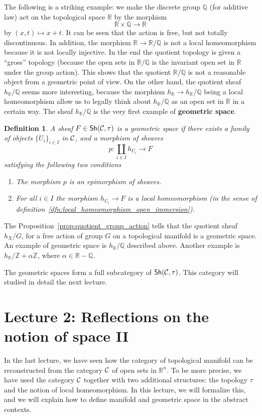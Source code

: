 \documentclass{tufte-book} %
\numberwithin{dummy}{section}
\newtheorem{dfn}[thm]{Definition}
\newcommand{\reals}{\mathbb R}
\newcommand{\intg}{\mathbb Z}
\newcommand{\ratl}{\mathbb Q}
\newcommand{\calc}{{\cal C}}
\newcommand{\lrta}{\longrightarrow}
\begin{document}
The following is a striking example: we make the discrete group $\ratl$ (for additive law) act on the topological space $\reals$ by the morphism
$$
\reals\times \ratl\lrta \reals
$$ 
by $(x,t)\longmapsto x+t$. It can be seen that the action is free, but not totally discontinuous. In addition, the morphism $\reals\lrta \reals/\ratl$ is not a local homeomorphism because it is not locally injective. In the end the quotient topology is given a ``gross'' topology (because the open sets in $\reals/\ratl$ is the invariant open set in $\reals$ under the group action). This shows that the quotient $\reals/\ratl$ is not a reasonable object from a geometric point of view. On the other hand, the quotient sheaf $h_\reals/\ratl$ seems more interesting, because the morphism $h_\reals\lrta h_\reals/\ratl$ being a local homeomorphism allow us to legally think about $h_\reals/\ratl$ as an open set in $\reals$ in a certain way. The sheaf $h_\reals/\ratl$ is the very first example of \textbf{geometric space}. 
\begin{dfn}
A sheaf $F\in\mathsf{Sh}(\calc,\tau)$ is a geometric space if there exists a family of objects $\{U_i\}_{i\in I}$ in $\calc$, and a morphism of sheaves
$$
p:\coprod_{i\in I}h_{U_i}\lrta F
$$
satisfying the following two conditions
\begin{enumerate}
\item The morphism $p$ is an epimorphism of sheaves.
\item For all $i\in I$ the morphism $h_{U_i}\lrta F$ is a local homeomorphism (in the sense of definition~\ref{dfn:local_homeomorphism_open_immersion}).
\end{enumerate}
\end{dfn}
The Proposition~\ref{prop:quotient_group_action} tells that the quotient sheaf $h_X/G$, for a free action of group $G$ on a topological manifold is a geometric space. An example of geometric space is $h_\reals/\ratl$ described above. Another example is $h_\reals/\intg+\alpha\intg$, where $\alpha\in \reals-\ratl$.

The geometric spaces form a full subcategory of $\mathsf{Sh}(\calc,\tau)$. This category will studied in detail the next lecture.

\section{Lecture 2: Reflections on the notion of space II}
In the last lecture, we have seen how the category of topological manifold can be reconstructed from the category $\calc$ of open sets in $\reals^n$. To be more precise, we have used the category $\calc$ together with two additional structures: the topology $\tau$ and the notion of local homeomorphism. In this lecture, we will formalize this, and we will explain how to define manifold and geometric space in the  abstract contexts.
\end{document}
